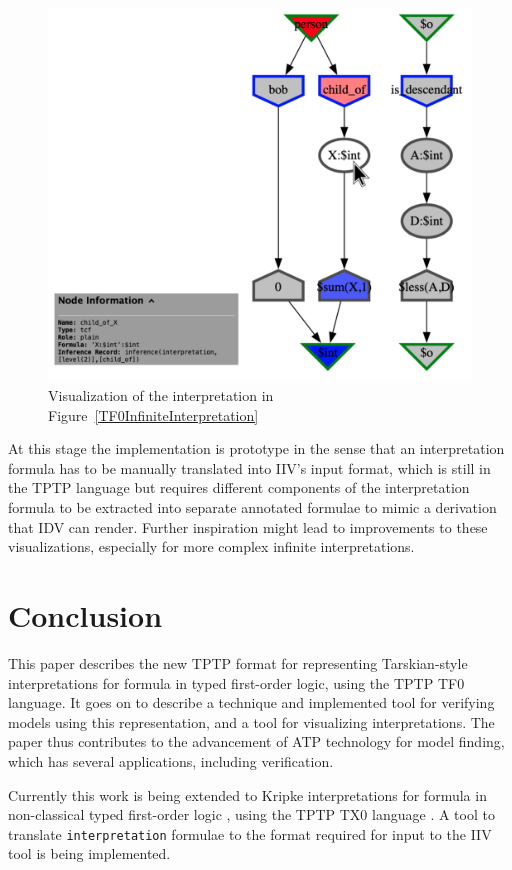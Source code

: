 \documentclass[letterpaper]{article}
\newcommand{\smalltt}[1]{\small \texttt{#1}}
\begin{document}
\begin{figure}[htbp]
\includegraphics[width=\columnwidth]{TFF_Integer.s.IIV.pdf}
\caption{Visualization of the interpretation in Figure~\ref{TF0InfiniteInterpretation}}
\label{TF0InfiniteIIV}
\end{figure}

At this stage the implementation is prototype in the sense that an interpretation formula
has to be manually translated into IIV's input format, which is still in the TPTP language
but requires different components of the interpretation formula to be extracted into
separate annotated formulae to mimic a derivation that IDV can render.
Further inspiration might lead to improvements to these visualizations, especially for more
complex infinite interpretations.

\section{Conclusion}
\label{Conclusion}

This paper describes the new TPTP format for representing Tarskian-style interpretations for
formula in typed first-order logic, using the TPTP TF0 language.
It goes on to describe a technique and implemented tool for verifying models using this 
representation, and a tool for visualizing interpretations.
The paper thus contributes to the advancement of ATP technology for model finding, which has
several applications, including verification.

Currently this work is being extended to Kripke interpretations for formula in non-classical 
typed first-order logic \cite{SF+22}, using the TPTP TX0 language \cite{Sut22-IGPL}.
A tool to translate \smalltt{interpretation} formulae to the format required for input to the 
IIV tool is being implemented.



\end{document}
